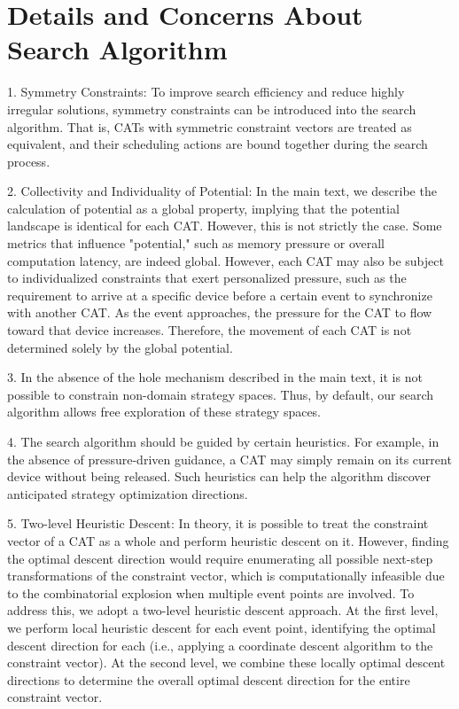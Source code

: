 \documentclass[letterpaper,twocolumn,10pt]{article}
\begin{document}
\section{Details and Concerns About Search Algorithm}
\label{sec:search_details}

1. Symmetry Constraints: To improve search efficiency and reduce highly irregular solutions, symmetry constraints can be introduced into the search algorithm. That is, CATs with symmetric constraint vectors are treated as equivalent, and their scheduling actions are bound together during the search process.

2. Collectivity and Individuality of Potential: In the main text, we describe the calculation of potential as a global property, implying that the potential landscape is identical for each CAT. However, this is not strictly the case. Some metrics that influence "potential," such as memory pressure or overall computation latency, are indeed global. However, each CAT may also be subject to individualized constraints that exert personalized pressure, such as the requirement to arrive at a specific device before a certain event to synchronize with another CAT. As the event approaches, the pressure for the CAT to flow toward that device increases. Therefore, the movement of each CAT is not determined solely by the global potential.

3. In the absence of the hole mechanism described in the main text, it is not possible to constrain non-domain strategy spaces. Thus, by default, our search algorithm allows free exploration of these strategy spaces.

4. The search algorithm should be guided by certain heuristics. For example, in the absence of pressure-driven guidance, a CAT may simply remain on its current device without being released. Such heuristics can help the algorithm discover anticipated strategy optimization directions.

5. Two-level Heuristic Descent: In theory, it is possible to treat the constraint vector of a CAT as a whole and perform heuristic descent on it. However, finding the optimal descent direction would require enumerating all possible next-step transformations of the constraint vector, which is computationally infeasible due to the combinatorial explosion when multiple event points are involved. To address this, we adopt a two-level heuristic descent approach. At the first level, we perform local heuristic descent for each event point, identifying the optimal descent direction for each (i.e., applying a coordinate descent algorithm to the constraint vector). At the second level, we combine these locally optimal descent directions to determine the overall optimal descent direction for the entire constraint vector.
\end{document}

